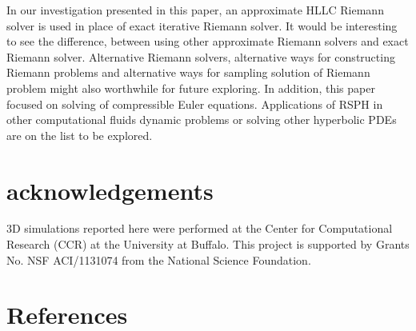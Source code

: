 \documentclass[review]{elsarticle}
\begin{document}
In our investigation presented in this paper, an approximate HLLC Riemann solver is used in place of exact iterative Riemann solver. It would be interesting to see the difference, between using other approximate Riemann solvers and exact Riemann solver. Alternative Riemann solvers, alternative ways for constructing Riemann problems and alternative ways for sampling solution of Riemann problem might also worthwhile for future exploring. In addition, this paper focused on solving of compressible Euler equations. Applications of RSPH in other computational fluids dynamic problems or solving other hyperbolic PDEs are on the list to be explored.

\section*{acknowledgements}
3D simulations reported here were performed at the Center for Computational Research (CCR) at the University at Buffalo. This project is supported by Grants No. NSF ACI/1131074 from the National Science Foundation.

\section*{References}

\end{document}
